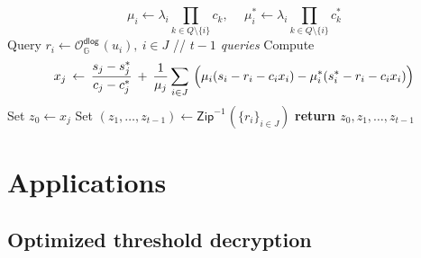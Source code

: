 \documentclass[psamsfonts, reqno]{amsart}
\theoremstyle{definition}
\theoremstyle{remark}
\numberwithin{equation}{section}
\begin{document}
\begin{minipage}{0.97\textwidth}
\begin{algorithm}[H]
\begin{algorithmic}[1]
    		\begin{equation*}
    			\mu_i \leftarrow \lambda_i
    			\prod_{k \in Q \setminus \{i\}} c_k,
    		\hspace{15pt}
    			\mu_i^* \leftarrow \lambda_i
    			\prod_{k \in Q \setminus \{i\}} c_k^*
    		\end{equation*}
    		\vspace{+10.0pt}
    	\EndFor
    	\State
    		Query $r_i \leftarrow
    		\mathcal{O}_{\mathbb{G}}^{\mathsf{dlog}}\hspace{1pt}(
    		\hspace{0pt}u_i\hspace{0pt}),
    		\ i \in J$
    		\hspace{38pt}// \textit{$t-1$ queries}\vspace{8pt}
    	\State
    		Compute
    		\vspace{10pt}
    		\begin{equation*}
    			x_j \hspace{2pt}\leftarrow\hspace{2pt}
    			\frac{s_j - s_j^*}{c_j - c_j^*}
    			\hspace{2pt}
    			+
    			\hspace{2pt}
				\frac{1}{\mu_j} \sum_{i \in J}
				\hspace{2pt}
				\Big(
					\mu_i (s_i - r_i - c_i x_i) -
					\mu_i^* (s_i^* - r_i - c_i x_i)
				\Big)
    		\vspace{6pt}
    		\end{equation*}
		\State
			Set $z_0 \leftarrow x_j$
			\vspace{6pt}
		\State
			Set
			$(z_1, \dots, z_{t-1})
			\leftarrow \mathsf{Zip}^{-1}\hspace{1pt}(
				\{r_i\}_{i \in J}
			)$
			\vspace{6pt}
		\State
			\textbf{return $z_0, z_1, \dots, z_{t-1}$}
			\vspace{5pt}
    \end{algorithmic}
\end{algorithm}
\vspace{5pt}
\end{minipage}

\section{Applications}

\subsection{Optimized threshold decryption}\label{section_optimized_threshold_decryption}
\end{document}
